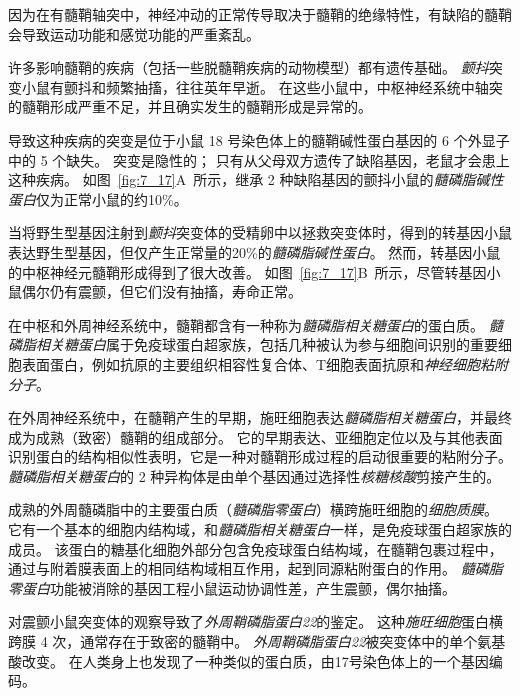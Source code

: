 \begin{proposition}[髓鞘蛋白缺陷破坏神经信号传导] \label{box:7_3}
	
	\quad \quad 因为在有髓鞘轴突中，神经冲动的正常传导取决于髓鞘的绝缘特性，有缺陷的髓鞘会导致运动功能和感觉功能的严重紊乱。
	
	\quad \quad 许多影响髓鞘的疾病（包括一些脱髓鞘疾病的动物模型）都有遗传基础。
	\textit{颤抖}突变小鼠有颤抖和频繁抽搐，往往英年早逝。
	在这些小鼠中，中枢神经系统中轴突的髓鞘形成严重不足，并且确实发生的髓鞘形成是异常的。
	
	\quad \quad 导致这种疾病的突变是位于小鼠 18 号染色体上的髓鞘碱性蛋白基因的 6 个外显子中的 5 个缺失。
	突变是隐性的；
	只有从父母双方遗传了缺陷基因，老鼠才会患上这种疾病。
	如图~\ref{fig:7_17}A~所示，继承 2 种缺陷基因的颤抖小鼠的\textit{髓磷脂碱性蛋白}仅为正常小鼠的约10\%。
	
	\quad \quad 当将野生型基因注射到\textit{颤抖}突变体的受精卵中以拯救突变体时，得到的转基因小鼠表达野生型基因，但仅产生正常量的20\%的\textit{髓磷脂碱性蛋白}。
	然而，转基因小鼠的中枢神经元髓鞘形成得到了很大改善。
	如图~\ref{fig:7_17}B~所示，尽管转基因小鼠偶尔仍有震颤，但它们没有抽搐，寿命正常。
	
	\quad \quad 在中枢和外周神经系统中，髓鞘都含有一种称为\textit{髓磷脂相关糖蛋白}的蛋白质。
	\textit{髓磷脂相关糖蛋白}属于免疫球蛋白超家族，包括几种被认为参与细胞间识别的重要细胞表面蛋白，例如抗原的主要组织相容性复合体、T细胞表面抗原和\textit{神经细胞粘附分子}。
	
	\quad \quad 在外周神经系统中，在髓鞘产生的早期，施旺细胞表达\textit{髓磷脂相关糖蛋白}，并最终成为成熟（致密）髓鞘的组成部分。
	它的早期表达、亚细胞定位以及与其他表面识别蛋白的结构相似性表明，它是一种对髓鞘形成过程的启动很重要的粘附分子。
	\textit{髓磷脂相关糖蛋白}的 2 种异构体是由单个基因通过选择性\textit{核糖核酸}剪接产生的。
	
	\quad 成熟的外周髓磷脂中的主要蛋白质（\textit{髓磷脂零蛋白}）横跨施旺细胞的\textit{细胞质膜}。
	它有一个基本的细胞内结构域，和\textit{髓磷脂相关糖蛋白}一样，是免疫球蛋白超家族的成员。
	该蛋白的糖基化细胞外部分包含免疫球蛋白结构域，在髓鞘包裹过程中，通过与附着膜表面上的相同结构域相互作用，起到同源粘附蛋白的作用。
	\textit{髓磷脂零蛋白}功能被消除的基因工程小鼠运动协调性差，产生震颤，偶尔抽搐。
	
	\quad 对震颤小鼠突变体的观察导致了\textit{外周鞘磷脂蛋白22}的鉴定。
	这种\textit{施旺细胞}蛋白横跨膜 4 次，通常存在于致密的髓鞘中。
	\textit{外周鞘磷脂蛋白22}被突变体中的单个氨基酸改变。
	在人类身上也发现了一种类似的蛋白质，由17号染色体上的一个基因编码。
	

\end{proposition}
